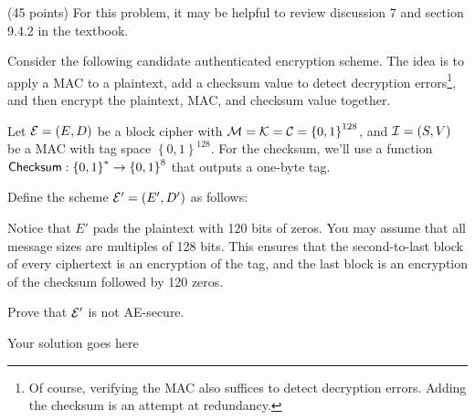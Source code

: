 \documentclass[12pt]{article}
\begin{document}
\begin{problem} (45 points)
For this problem, it may be helpful to review discussion 7 and section 9.4.2 in the textbook.

    Consider the following candidate authenticated encryption scheme. The idea is to apply a MAC to a plaintext, add a checksum value to detect decryption errors\footnote{Of course, verifying the MAC also suffices to detect decryption errors. Adding the checksum is an attempt at redundancy.}, and then encrypt the plaintext, MAC, and checksum value together.

    Let $\mathcal{E}=(E,D)$ be a block cipher with  $\mathcal{M} = \mathcal{K} = \mathcal{C} = \left\{0,1 \right\}^{128}$, and $\mathcal{I}=(S,V)$ be a MAC with tag space $\left\{0,1 \right\}^{128}$. For the checksum, we'll use a function $\textsf{Checksum} : \left\{0,1 \right\}^* \to \left\{0,1 \right\}^{8}$ that outputs a one-byte tag. 

    Define the scheme $\mathcal{E}'  = (E',D')$ as follows:

    \begin{figure}[h!]
        \center
        \begin{subfigure}{0.45\linewidth}
        \end{subfigure}
        \begin{subfigure}{0.45\linewidth}
        \end{subfigure}
    \end{figure}

Notice that $E'$ pads the plaintext with 120 bits of zeros. You may assume that all message sizes are multiples of 128 bits. This ensures that the second-to-last block of every ciphertext is an encryption of the tag, and the last block is an encryption of the checksum followed by 120 zeros.

Prove that $\mathcal{E}'$ is not AE-secure.
\end{problem}

\begin{solution}
Your solution goes here
\end{solution}
\end{document}
